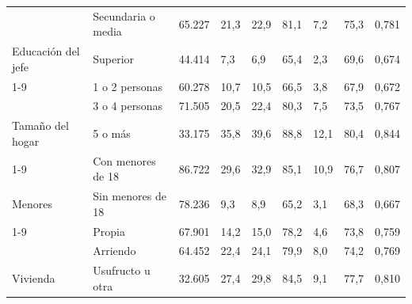 \begin{table}[H]
{\begin{tabular}[t]{lllllllll}
 & Secundaria o media & 65.227 & 21,3 & 22,9 & 81,1 & 7,2 & 75,3 & 0,781\\

\multirow[t]{-2}{*}[\normalbaselineskip]{\raggedright\arraybackslash Educación del jefe} & Superior & 44.414 & 7,3 & 6,9 & 65,4 & 2,3 & 69,6 & 0,674\\
\cmidrule{1-9}
 & 1 o 2 personas & 60.278 & 10,7 & 10,5 & 66,5 & 3,8 & 67,9 & 0,672\\

 & 3 o 4 personas & 71.505 & 20,5 & 22,4 & 80,3 & 7,5 & 73,5 & 0,767\\

\multirow[t]{-2}{*}[\normalbaselineskip]{\raggedright\arraybackslash Tamaño del hogar} & 5 o más & 33.175 & 35,8 & 39,6 & 88,8 & 12,1 & 80,4 & 0,844\\
\cmidrule{1-9}
 & Con menores de 18 & 86.722 & 29,6 & 32,9 & 85,1 & 10,9 & 76,7 & 0,807\\

\multirow[t]{-1}{*}[\normalbaselineskip]{\raggedright\arraybackslash Menores} & Sin menores de 18 & 78.236 & 9,3 & 8,9 & 65,2 & 3,1 & 68,3 & 0,667\\
\cmidrule{1-9}
 & Propia & 67.901 & 14,2 & 15,0 & 78,2 & 4,6 & 73,8 & 0,759\\

 & Arriendo & 64.452 & 22,4 & 24,1 & 79,9 & 8,0 & 74,2 & 0,769\\

\multirow[t]{-2}{*}[\normalbaselineskip]{\raggedright\arraybackslash Vivienda} & Usufructo u otra & 32.605 & 27,4 & 29,8 & 84,5 & 9,1 & 77,7 & 0,810\\
\bottomrule
\end{tabular}}
\end{table}
